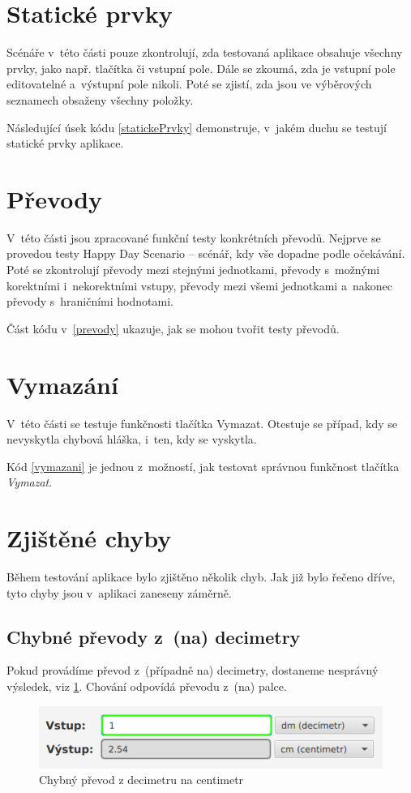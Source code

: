 	\section{Statické prvky}
	Scénáře v~této části pouze zkontrolují, zda testovaná aplikace obsahuje všechny prvky, jako např. tlačítka či vstupní pole. Dále se zkoumá, zda je vstupní pole editovatelné a~výstupní pole nikoli. Poté se zjistí, zda jsou ve výběrových seznamech obsaženy všechny položky.
	
	Následující úsek kódu \ref{statickePrvky} demonstruje, v~jakém duchu se testují statické prvky aplikace.
	
	
	\section{Převody}
	V~této části jsou zpracované funkční testy konkrétních převodů. Nejprve se provedou testy Happy Day Scenario -- scénář, kdy vše dopadne podle očekávání. Poté se zkontrolují převody mezi stejnými jednotkami, převody s~možnými korektními i~nekorektními vstupy, převody mezi všemi jednotkami a~nakonec převody s~hraničními hodnotami.
	
	Část kódu v~\ref{prevody} ukazuje, jak se mohou tvořit testy převodů.
	
	
	\section{Vymazání}
	V~této části se testuje funkčnosti tlačítka Vymazat. Otestuje se případ, kdy se nevyskytla chybová hláška, i~ten, kdy se vyskytla.
	
	Kód \ref{vymazani} je jednou z~možností, jak testovat správnou funkčnost tlačítka \emph{Vymazat}.
	
	
	\section{Zjištěné chyby}
	Během testování aplikace bylo zjištěno několik chyb. Jak již bylo řečeno dříve, tyto chyby jsou v~aplikaci zaneseny záměrně.
	
		\subsection{Chybné převody z~(na) decimetry}
		Pokud provádíme převod z~(případně na) decimetry, dostaneme nesprávný výsledek, viz \ref{ChybaDm}. Chování odpovídá převodu z~(na) palce.
			\begin{figure}[ht!]
				\centering
				\caption{Chybný převod z decimetru na centimetr}
				\label{ChybaDm}
				\includegraphics[width=13.5cm]{img/Chyby/Dm.png}
			\end{figure}
			\FloatBarrier
		
